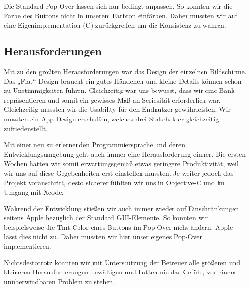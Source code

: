 Die Standard Pop-Over lassen sich nur bedingt anpassen. So konnten wir die Farbe des Buttons nicht in unserem Farbton einfärben. Daher mussten wir auf eine Eigenimplementation (C) zurückgreifen um die Konsistenz zu wahren.


\subsection{Herausforderungen}
	Mit zu den größten Herausforderungen war das Design der einzelnen Bildschirme. Das „Flat“-Design braucht ein gutes Händchen und kleine Details können schon zu Unstimmigkeiten führen. Gleichzeitig war uns bewusst, dass wir eine Bank repräsentieren und somit ein gewisses Maß an Seriosität erforderlich war. Gleichzeitig mussten wir die Usability für den Endnutzer gewährleisten. Wir mussten ein App-Design erschaffen, welches drei Stakeholder gleichzeitig zufriedenstellt.

%

	Mit einer neu zu erlernenden Programmiersprache und deren Entwicklungsumgebung geht auch immer eine Herausforderung einher. Die ersten Wochen hatten wir somit erwartungsgemäß etwas geringere Produktivität, weil wir uns auf diese Gegebenheiten erst einstellen mussten. Je weiter jedoch das Projekt voranschritt, desto sicherer fühlten wir uns in Objective-C und im Umgang mit Xcode.

	Während der Entwicklung stießen wir auch immer wieder auf Einschränkungen seitens Apple bezüglich der Standard GUI-Elemente. So konnten wir beispielsweise die Tint-Color eines Buttons im Pop-Over nicht ändern. Apple lässt dies nicht zu. Daher mussten wir hier unser eigenes Pop-Over implementieren.

	Nichtsdestotrotz konnten wir mit Unterstützung der Betreuer alle größeren und kleineren Herausforderungen bewältigen und hatten nie das Gefühl, vor einem unüberwindbaren Problem zu stehen.
